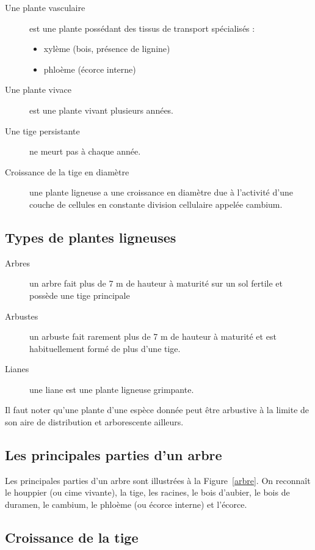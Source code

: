 \begin{description} 
\item[Une plante vasculaire]est une plante possédant des tissus de transport spécialisés : 
 
\begin{itemize}
\item xylème (bois, présence de lignine) 
\item phloème (écorce interne)
\end{itemize}
 
\item[Une plante vivace]est une plante vivant plusieurs années. 
\item[Une tige persistante]ne meurt pas à chaque année. 
\item[Croissance de la tige en diamètre] une plante ligneuse a une croissance en diamètre due à l'activité d'une couche de cellules en constante division cellulaire appelée cambium. 
\end{description}
 
\subsection{Types de plantes ligneuses} 
 
\begin{description}
\item[Arbres] un arbre fait plus de 7 m de hauteur à maturité sur un sol fertile et possède une tige principale 
\item[Arbustes] un arbuste fait rarement plus de 7 m de hauteur à maturité et est habituellement formé de plus d'une tige. 
\item[Lianes] une liane est une plante ligneuse grimpante.
\end{description}

Il faut noter qu'une plante d'une espèce donnée peut être arbustive à la limite de son aire de distribution et arborescente ailleurs. 
 
\subsection{Les principales parties d'un arbre}
 
Les principales parties d'un arbre sont illustrées à la Figure~\ref{arbre}. On reconnaît le houppier (ou cime vivante), la tige, les racines, le bois d'aubier, le bois de duramen, le cambium, le phloème (ou écorce interne) et l'écorce. 
 
\subsection{Croissance de la tige}\label{croissance_cernes}
 
